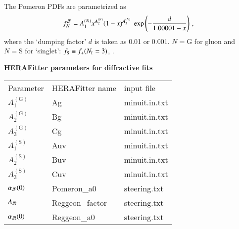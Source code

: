 The Pomeron PDFs are parametrized as
\def\Cini#1#2{A^{(#1)}_#2}
\begin{equation}
\label{eq:fP0}
f^\Pom_N = \Cini N1  x^{\Cini N2} (1-x)^{\Cini N3}
  \; \exp\left(-\frac{d}{1.00001-x}\right)
\,,
\end{equation}
where the `dumping factor' $d$ is taken as 0.01 or 0.001.
$N = \mathrm G$ for gluon and $N = \mathrm S$ for `singlet': $f_{\rm S} \equiv f_+(\NF=3)$,
\cf {}.


{\bf HERAFitter parameters for diffractive fits} \\
\label{sec:HFitterPar}


\begin{tabular}{l|l|l}
Parameter & HERAFitter name & input file\\
$\Cini {\mathrm G}1$ & Ag & minuit.in.txt \\
$\Cini {\mathrm G}2$ & Bg & minuit.in.txt \\
$\Cini {\mathrm G}3$ & Cg & minuit.in.txt \\
$\Cini {\mathrm S}1$ & Auv & minuit.in.txt \\
$\Cini {\mathrm S}2$ & Buv & minuit.in.txt \\
$\Cini {\mathrm S}3$ & Cuv & minuit.in.txt \\
$\alpha_{I\!P}(0)$ & Pomeron\_a0 & steering.txt \\
$A_{I\!R}$ & Reggeon\_factor & steering.txt \\
$\alpha_{I\!R}(0)$ & Reggeon\_a0 & steering.txt \\
\end{tabular}





